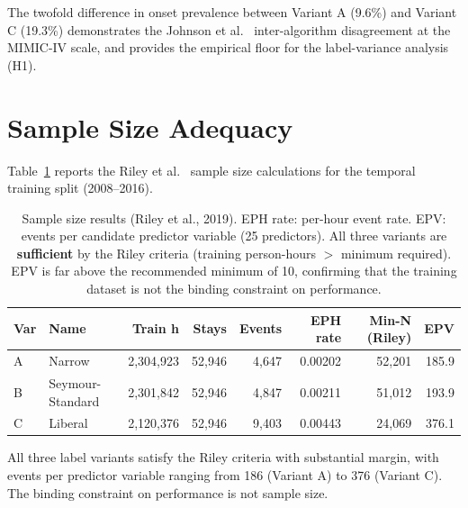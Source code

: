 The twofold difference in onset prevalence between Variant A (9.6\%) and Variant C
(19.3\%) demonstrates the Johnson et al.\ \parencite{johnson2018comparative}
inter-algorithm disagreement at the MIMIC-IV scale, and provides the empirical
floor for the label-variance analysis (H1).

\section{Sample Size Adequacy}
\label{sec:sample_size_results}

Table~\ref{tab:sample_size} reports the Riley et al.\ \parencite{riley2019sample}
sample size calculations for the temporal training split (2008--2016).

\begin{table}[H]
  \centering
  \begin{tabular}{llrrrrrr}
    \toprule
    \textbf{Var} & \textbf{Name} & \textbf{Train h} & \textbf{Stays}
      & \textbf{Events} & \textbf{EPH rate} & \textbf{Min-N (Riley)}
      & \textbf{EPV} \\
    \midrule
    A & Narrow           & 2{,}304{,}923 & 52{,}946 & 4{,}647 & 0.00202
      & 52{,}201 & 185.9 \\
    B & Seymour-Standard & 2{,}301{,}842 & 52{,}946 & 4{,}847 & 0.00211
      & 51{,}012 & 193.9 \\
    C & Liberal          & 2{,}120{,}376 & 52{,}946 & 9{,}403 & 0.00443
      & 24{,}069 & 376.1 \\
    \bottomrule
  \end{tabular}
  \caption{Sample size results (Riley et al., 2019). EPH rate: per-hour event
  rate. EPV: events per candidate predictor variable (25 predictors). All three
  variants are \textbf{sufficient} by the Riley criteria (training person-hours
  $>$ minimum required). EPV is far above the recommended minimum of 10,
  confirming that the training dataset is not the binding constraint on performance.}
  \label{tab:sample_size}
\end{table}

All three label variants satisfy the Riley criteria with substantial margin,
with events per predictor variable ranging from 186 (Variant A) to 376 (Variant C).
The binding constraint on performance is not sample size.

